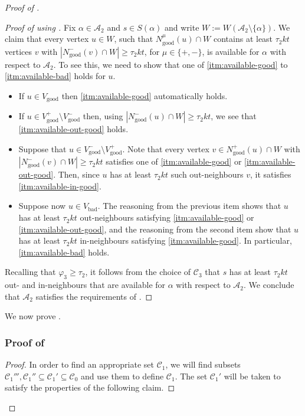 \documentclass[english]{article}
\theoremstyle{plain}
\theoremstyle{remark}
\def\C{\mathcal{C}}
\let\phi\varphi
\def \Vgp {V_{\good}^+}
\def \Vgp {V_{\good}^+}
\def \Vgm {V_{\good}^-}
\def \Vg {V_{\good}}
\def \Vb {V_{\bad}}
\def \Vgm {V_{\good}^-}
\def \Nmu{N^{\mu}_{\good}}
\def \Npg{N^+_{\good}}
\def \Nmg{N^-_{\good}}
\newcommand{\A}{\mathcal{A}}
\DeclareMathOperator{\bad}{bad}
\DeclareMathOperator{\good}{good}
\begin{document}
\begin{proof}[Proof of ]
\begin{proof}[Proof of  using ]
			Fix $\alpha \in \A_2$ and $s \in S(\alpha)$ and write $W := W(\A_2 \setminus \{\alpha\})$.
			We claim that every vertex $u \in W$, such that $\Nmu(u) \cap W$ contains at least $\tau_2 kt$ vertices $v$ with $|\Nmg(v) \cap W| \ge \tau_2 kt$, for $\mu \in \{+, -\}$, is available for $\alpha$ with respect to $\A_2$. To see this, we need to show that one of \ref{itm:available-good} to \ref{itm:available-bad} holds for $u$. 
			\begin{itemize}
				\item
					If $u \in \Vg$ then \ref{itm:available-good} automatically holds. 
				\item
					If $u \in \Vgp \setminus \Vgm$ then, using $|\Nmg(u) \cap W| \ge \tau_2 kt$, we see that \ref{itm:available-out-good} holds. 
				\item
					Suppose that $u \in \Vgm \setminus \Vgp$. 
					Note that every vertex $v \in \Npg(u) \cap W$ with $|\Nmg(v) \cap W| \ge \tau_2 kt$ satisfies one of \ref{itm:available-good} or \ref{itm:available-out-good}. Then, since $u$ has at least $\tau_2 kt$ such out-neighbours $v$, it satisfies \ref{itm:available-in-good}.
				\item
					Suppose now $u \in \Vb$.
					The reasoning from the previous item shows that $u$ has at least $\tau_2 kt$ out-neighbours satisfying \ref{itm:available-good} or \ref{itm:available-out-good}, and the reasoning from the second item show that $u$ has at least $\tau_2 kt$ in-neighbours satisfying \ref{itm:available-good}. In particular, \ref{itm:available-bad} holds.
			\end{itemize}
			Recalling that $\phi_3 \ge \tau_2$, it follows from the choice of $\C_3$ that $s$ has at least $\tau_2 kt$ out- and in-neighbours that are available for $\alpha$ with respect to $\A_2$. We conclude that $\A_2$ satisfies the requirements of .
		\end{proof}

		We now prove .

		\subsubsection{Proof of }
			\begin{proof}

				In order to find an appropriate set $\C_1$, we will find subsets $\C_1''', \C_1'' \subseteq \C_1' \subseteq \C_0$ and use them to define $\C_1$. The set $\C_1'$ will be taken to satisfy the properties of the following claim.


\end{proof}
\end{proof}
\end{document}
